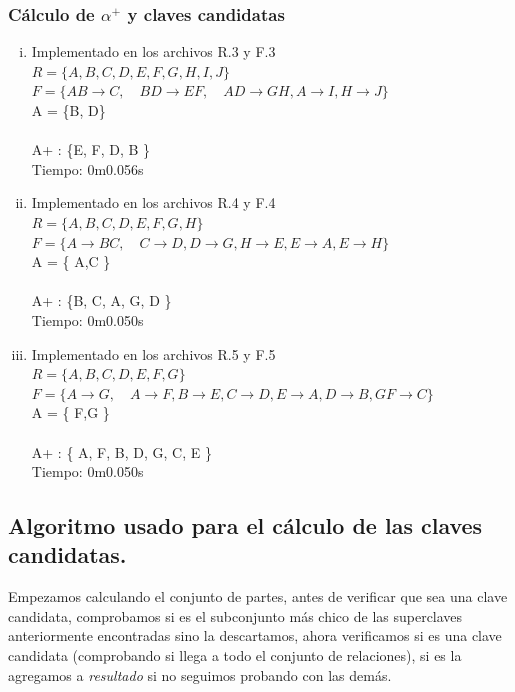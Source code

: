 \documentclass{article}
\begin{document}
\subsubsection{Cálculo de $\alpha^+$ y claves candidatas}
\begin{enumerate}[i.]
  \item
    Implementado en los archivos R.3 y F.3 \\
    $R = \{A, B ,C, D, E, F, G, H, I, J \}$ \\
    $F = \{ AB \rightarrow C, \quad BD \rightarrow EF, \quad AD \rightarrow GH, A \rightarrow I, H \rightarrow J \}$ \\
    A = \{B, D\} \\ \\
    A+  : \{E, F, D, B \} \\
    Tiempo: 0m0.056s
  \item
    Implementado en los archivos R.4 y F.4 \\
    $R = \{A, B, C, D, E, F, G, H\}$ \\
    $F = \{ A \rightarrow BC, \quad C \rightarrow D, D \rightarrow G, H \rightarrow E, E \rightarrow A, E \rightarrow H \}$ \\ 
    A  = \{ A,C \} \\ \\
    A+ : \{B, C, A, G, D \} \\
    Tiempo: 0m0.050s
  \item
    Implementado en los archivos R.5 y F.5 \\
    $R = \{A, B, C, D, E, F, G\}$ \\
    $F = \{ A \rightarrow G, \quad A \rightarrow F, B \rightarrow E, C \rightarrow D, E \rightarrow A, D \rightarrow B, GF \rightarrow C \}$ \\
    A  = \{ F,G \} \\ \\
    A+ : \{ A, F, B, D, G, C, E \} \\
    Tiempo: 0m0.050s
\end{enumerate}
\subsection{Algoritmo usado para el cálculo de las claves candidatas.}
\noindent
Empezamos calculando el conjunto de partes, antes de verificar que sea una clave candidata, comprobamos si es el subconjunto más chico de las superclaves anteriormente encontradas sino la descartamos, ahora verificamos si es una clave candidata (comprobando si llega a todo el conjunto de relaciones), si es la agregamos a \textit{resultado} si no seguimos probando con
las demás.
\end{document}
